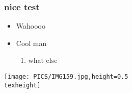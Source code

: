 \documentclass{beamer}
\begin{document}
\begin{frame}
 \frametitle{nice test}
  


\begin{itemize}
  \item Wahoooo
  \item Cool man
\begin{enumerate}
  \item what else
\end{enumerate}
\end{itemize}
\texttt{[image: PICS/IMG159.jpg,height=0.5\\texheight]}

  
\end{frame}
\end{document}
